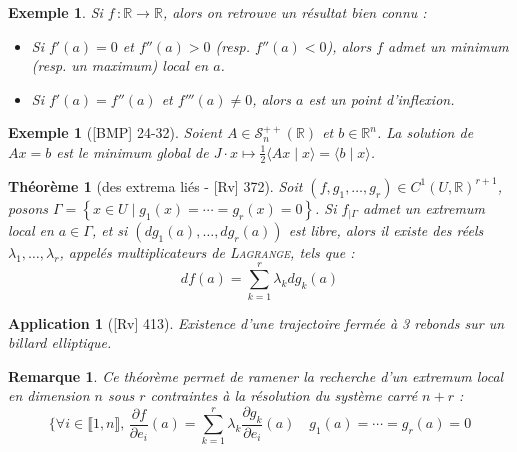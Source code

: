 \documentclass[10pt, a4paper, parskip=full, twoside, twocolumn]{report}
\newtheorem{theorem}[definition]{Théorème}
\newtheorem{example}[definition]{Exemple}
\newtheorem{remark}[definition]{Remarque}
\newtheorem*{application*}{Application}
\newcommand{\IR}{\mathbb{R}}
\newcommand{\ps}[2]{\langle #1\mid #2\rangle}
\begin{document}
\begin{example}
	Si $f\,\colon \IR \to \IR$, alors on retrouve un résultat bien connu :
	\begin{itemize}
		\item Si $f'(a) = 0$ et $f''(a) > 0$ (resp. $f''(a)< 0$), alors $f$ admet un minimum (resp. un maximum) local en $a$.
		\item Si $f'(a) = f''(a)$ et $f'''(a) \neq 0$, alors $a$ est un point d'inflexion.
	\end{itemize}
\end{example}

\begin{example}[\textnormal{[BMP] 24-32}]
	Soient $A\in \mathcal{S}_n^{++}(\IR)$ et $b\in\IR^n$. La solution de $Ax= b$ est le minimum global de $J\cdot x \mapsto \frac{1}{2}\ps{Ax}{x} = \ps{b}{x}$.
\end{example}

\begin{theorem}[des extrema liés - \textnormal{[Rv] 372}]
	Soit $(f, g_1,\dots, g_r)\in C^1(U, \IR)^{r+1}$, posons $\Gamma = \left\{x\in U \mid g_1(x)=\cdots=g_r(x)=0\right\}$.
	Si $f_{\mid \Gamma}$ admet un extremum local en $a\in \Gamma$, et si $(dg_1(a),\dots,dg_r(a))$ est libre, alors il existe des réels $\lambda_1,\dots,\lambda_r$, appelés \emph{multiplicateurs de \textsc{Lagrange}}, tels que :
	$$df(a) = \sum_{k=1}^{r} \lambda_kdg_k(a)$$
\end{theorem}


\begin{tcolorbox}[
    breakable, %
    colback=developpement, %
    colframe=gray!0!black, %
    boxrule=0pt, %
    arc=1mm, %
	boxsep=0pt,
	left=0pt, right=0pt, top=0pt, bottom=0pt
]
\begin{application*}[\textnormal{[Rv] 413}]
	\label{215dev2}
	Existence d'une trajectoire fermée à 3 rebonds sur un billard elliptique.
\end{application*}
\end{tcolorbox}

\begin{remark}
	Ce théorème permet de ramener la recherche d'un extremum local en dimension $n$ sous $r$ contraintes à la résolution du système carré $n+r$ :
	$$\{ \forall i\in\llbracket 1,n\rrbracket,\, \frac{\partial f}{\partial e_i}(a) = \sum_{k=1}^{r}\lambda_k\frac{\partial g_k}{\partial e_i}(a)\quad g_1(a) = \cdots = g_r(a) = 0$$
\end{remark}
\end{document}
